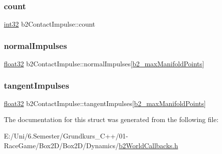 \subsubsection{\texorpdfstring{count}{count}}
{\footnotesize\ttfamily \mbox{\hyperlink{b2_settings_8h_a43d43196463bde49cb067f5c20ab8481}{int32}} b2\+Contact\+Impulse\+::count}

\mbox{\label{structb2_contact_impulse_a553d3562a3a34ea013e2d9860f6fd207}} 
\subsubsection{\texorpdfstring{normalImpulses}{normalImpulses}}
{\footnotesize\ttfamily \mbox{\hyperlink{b2_settings_8h_aacdc525d6f7bddb3ae95d5c311bd06a1}{float32}} b2\+Contact\+Impulse\+::normal\+Impulses\mbox{[}\mbox{\hyperlink{b2_settings_8h_aa5f44cc9edf711433dea2b2ec94f3c42}{b2\+\_\+max\+Manifold\+Points}}\mbox{]}}

\mbox{\label{structb2_contact_impulse_aebd9875b1f55a90865770a53e30e609a}} 
\subsubsection{\texorpdfstring{tangentImpulses}{tangentImpulses}}
{\footnotesize\ttfamily \mbox{\hyperlink{b2_settings_8h_aacdc525d6f7bddb3ae95d5c311bd06a1}{float32}} b2\+Contact\+Impulse\+::tangent\+Impulses\mbox{[}\mbox{\hyperlink{b2_settings_8h_aa5f44cc9edf711433dea2b2ec94f3c42}{b2\+\_\+max\+Manifold\+Points}}\mbox{]}}



The documentation for this struct was generated from the following file\+:\begin{DoxyCompactItemize}
\item 
E\+:/\+Uni/6.\+Semester/\+Grundkurs\+\_\+\+C++/01-\/\+Race\+Game/\+Box2\+D/\+Box2\+D/\+Dynamics/\mbox{\hyperlink{b2_world_callbacks_8h}{b2\+World\+Callbacks.\+h}}\end{DoxyCompactItemize}
